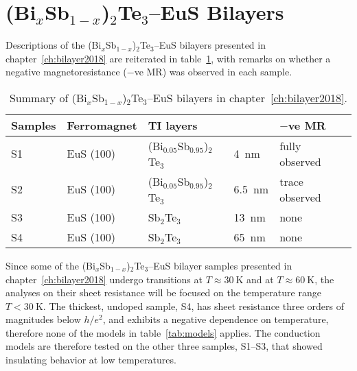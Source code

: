 \section{(Bi$_x$Sb$_{1-x}$)$_2$Te$_3$--EuS Bilayers}
Descriptions of the (Bi$_x$Sb$_{1-x}$)$_2$Te$_3$--EuS bilayers presented in chapter~\ref{ch:bilayer2018} are reiterated in table~\ref{tab:models_bl2018}, with remarks on whether a negative magnetoresistance ($-$ve MR) was observed in each sample.%
%
\begin{table}[ht]
    \centering
    \begin{tabularx}{0.75\columnwidth}[t]{l|l|l|l|X}
    \caption[Summary of (Bi$_x$Sb$_{1-x}$)$_2$Te$_3$--EuS bilayers]{\label{tab:models_bl2018}Summary of (Bi$_x$Sb$_{1-x}$)$_2$Te$_3$--EuS bilayers in chapter~\ref{ch:bilayer2018}.}\\
		\hline\hline
        Samples & Ferromagnet & \multicolumn{2}{X|}{TI layers} & $-$ve MR\\
        \hline%
        S1 & EuS (100) & (Bi$_{0.05}$Sb$_{0.95}$)$_2$Te$_3$ & 4~nm & fully observed\\
        S2 & EuS (100) & (Bi$_{0.05}$Sb$_{0.95}$)$_2$Te$_3$ & 6.5~nm & trace observed\\
        S3 & EuS (100) & Sb$_2$Te$_3$ & 13~nm & none\\
        S4 & EuS (100) & Sb$_2$Te$_3$ & 65~nm & none\\
		\hline\hline
    \end{tabularx}
\end{table} %
Since some of the (Bi$_x$Sb$_{1-x}$)$_2$Te$_3$--EuS bilayer samples presented in chapter~\ref{ch:bilayer2018} undergo transitions at $T\approx 30~\mathrm{K}$ and at $T \approx 60~\mathrm{K}$, the analyses on their sheet resistance will be focused on the temperature range $T < 30~\mathrm{K}$. The thickest, undoped sample, S4, has sheet resistance three orders of magnitudes below $h/e^2$, and exhibits a negative dependence on temperature, therefore none of the models in table~\ref{tab:models} applies. The conduction models are therefore tested on the other three samples, S1--S3, that showed insulating behavior at low temperatures.

